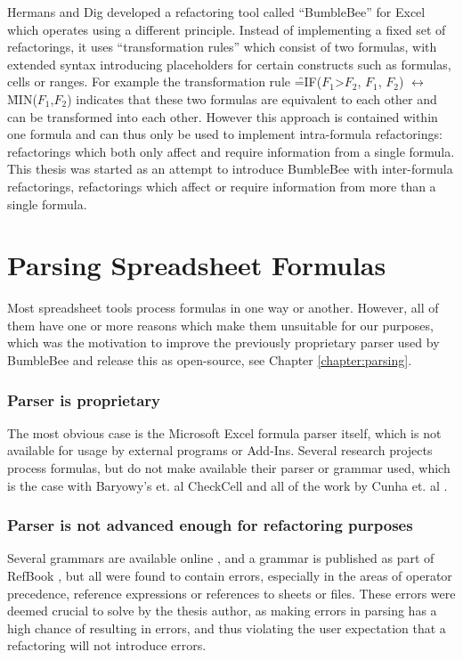 Hermans and Dig \cite{hermans2014bumblebee} developed a refactoring tool called ``BumbleBee'' for Excel which operates using a different principle.
Instead of implementing a fixed set of refactorings, it uses  ``transformation rules'' which consist of two formulas, with extended syntax introducing placeholders for certain constructs such as formulas, cells or ranges.
For example the transformation rule \f{=IF($F_1$>$F_2$, $F_1$, $F_2$)} $\leftrightarrow$ \f{MIN($F_1$,$F_2$)} indicates that these two formulas are equivalent to each other and can be transformed into each other.
However this approach is contained within one formula and can thus only be used to implement intra-formula refactorings: refactorings which both only affect and require information from a single formula.
This thesis was started as an attempt to introduce BumbleBee with inter-formula refactorings, refactorings which affect or require information from more than a single formula.

\section{Parsing Spreadsheet Formulas}

Most spreadsheet tools process formulas in one way or another.
However, all of them have one or more reasons which make them unsuitable for our purposes, which was the motivation to improve the previously proprietary parser used by BumbleBee and release this as open-source, see Chapter \ref{chapter:parsing}.

\subsubsection{Parser is proprietary}

The most obvious case is the Microsoft Excel formula parser itself, which is not available for usage by external programs or Add-Ins.
Several research projects process formulas, but do not make available their parser or grammar used, which is the case with Baryowy's et. al CheckCell \cite{barowy2014checkcell} and all of the work by Cunha et. al \cite{cunha2010automatically, cunha2012towards, cunha2012mdsheet}.

\subsubsection{Parser is not advanced enough for refactoring purposes}

Several grammars are available online \cite{ewbi,fishbrain}, and a grammar is published as part of RefBook \cite{badame2012refactoring}, but all were found to contain errors, especially in the areas of operator precedence, reference expressions or references to sheets or files.
These errors were deemed crucial to solve by the thesis author, as making errors in parsing has a high chance of resulting in errors, and thus violating the user expectation that a refactoring will not introduce errors.

